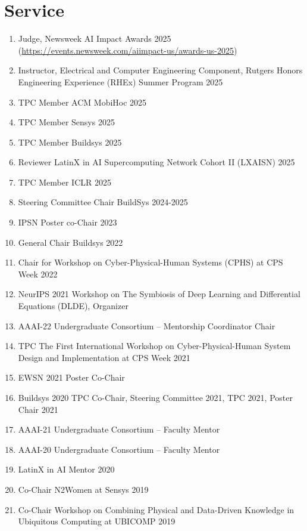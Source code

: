 \documentclass[12pt]{article}
\begin{document}
\newpage
\section{Service}
\begin{enumerate}
    \item Judge, Newsweek AI Impact Awards 2025 (\href{https://events.newsweek.com/aiimpact-us/awards-us-2025}{https://events.newsweek.com/aiimpact-us/awards-us-2025})
    \item Instructor, Electrical and Computer Engineering Component, Rutgers Honors Engineering Experience (RHEx) Summer Program 2025
    \item TPC Member ACM MobiHoc 2025
    \item TPC Member Sensys 2025
    \item TPC Member Buildsys 2025
    \item Reviewer LatinX in AI Supercomputing Network Cohort II (LXAISN) 2025
    \item TPC Member ICLR 2025
    \item Steering Committee Chair BuildSys 2024-2025
    \item IPSN Poster co-Chair 2023
    \item General Chair Buildsys 2022
    \item Chair for Workshop on Cyber-Physical-Human Systems (CPHS) at CPS Week 2022
    \item NeurIPS 2021 Workshop on The Symbiosis of Deep Learning and Differential Equations (DLDE), Organizer
    \item AAAI-22 Undergraduate Consortium -- Mentorship Coordinator Chair
    \item TPC The First International Workshop on Cyber-Physical-Human System Design and Implementation at CPS Week 2021
    \item EWSN 2021 Poster Co-Chair
    \item Buildsys 2020 TPC Co-Chair, Steering Committee 2021, TPC 2021, Poster Chair 2021
    \item AAAI-21 Undergraduate Consortium -- Faculty Mentor
    \item AAAI-20 Undergraduate Consortium -- Faculty Mentor
    \item LatinX in AI Mentor 2020
    \item Co-Chair N2Women at Sensys 2019
    \item Co-Chair Workshop on Combining Physical and Data-Driven Knowledge in Ubiquitous Computing at UBICOMP 2019

\end{enumerate}
\end{document}
